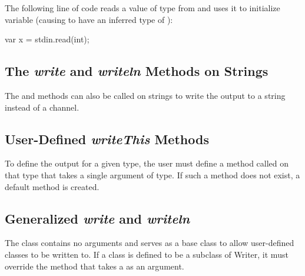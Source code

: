 \begin{example}
The following line of code reads a value of type  from
 and uses it to initialize variable  (causing
 to have an inferred type of ):
\begin{chapel}
var x = stdin.read(int);
\end{chapel}
\end{example}


\subsection{The {\em write} and {\em writeln} Methods on Strings}
\label{stringwrite}

The  and  methods can also be called on
strings to write the output to a string instead of a channel.




\subsection{User-Defined {\em writeThis} Methods}

To define the output for a given type, the user must define a method
called  on that type that takes a single argument of
 type.  If such a method does not exist, a default method is
created.




\subsection{Generalized {\em write} and {\em writeln}}
\label{writer}

The  class contains no arguments and serves as a base
class to allow user-defined classes to be written to.  If a class is
defined to be a subclass of Writer, it must override
the  method that takes a  as an argument.

